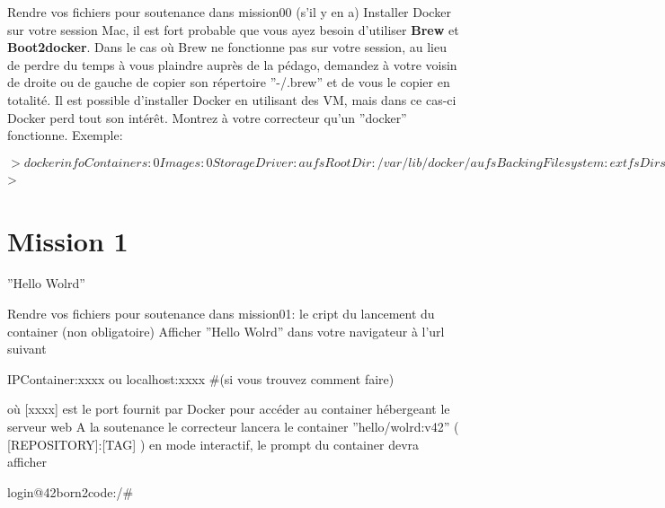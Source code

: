 \documentclass{42}
\begin{document}
Rendre vos fichiers pour soutenance dans mission00 (s’il y en a)
\newline
\newline
Installer Docker sur votre session Mac, il est fort probable que vous ayez besoin d’utiliser \textbf{Brew} et \textbf{Boot2docker}.
\newline
\newline
Dans le cas où Brew ne fonctionne pas sur votre session, au lieu de perdre du temps à vous plaindre auprès de la pédago, demandez à votre voisin de droite ou de gauche de copier son répertoire ''-/.brew'' et de vous le copier en totalité.
\newline
\newline
Il est possible d’installer Docker en utilisant des VM, mais dans ce cas-ci Docker perd tout son intérêt.
\newline
\newline
Montrez à votre correcteur qu’un ''docker'' fonctionne.
\newline
\newline
Exemple:
\begin{42ccode}

$> docker info
Containers: 0
Images: 0
Storage Driver: aufs
 Root Dir: /var/lib/docker/aufs
 Backing Filesystem: extfs
 Dirs: 0
Execution Driver: native-0.2
Kernel Version: 3.16.0-30-generic
Operating System: Ubuntu 14.10
CPUs: 2
Total Memory: 3.633 GiB
Name: ubuntu
ID: PDDP:L64U:RQBT:G5ET:TEAC:XIJK:7JMR:ZVJW:NWU3:JMMD:YV36:WRUM
WARNING: No swap limit support
$>

\end{42ccode}


	\newpage

\section{Mission 1}
\begin{center}
	{\Huge ''Hello Wolrd''}
\end{center}

Rendre vos fichiers pour soutenance dans mission01: le cript du lancement du container (non obligatoire)
\newline
\newline
Afficher ''Hello Wolrd'' dans votre navigateur à l’url suivant
\begin{42ccode}
IPContainer:xxxx ou localhost:xxxx #(si vous trouvez comment faire)
\end{42ccode}
où [xxxx] est le port fournit par Docker pour accéder au container hébergeant le serveur web
\newline
\newline
A la soutenance le correcteur lancera le container ''hello/wolrd:v42'' ( [REPOSITORY]:[TAG] ) en mode interactif, le prompt du container devra afficher
\begin{42ccode}
login@42born2code:/#
\end{42ccode}
\end{document}
